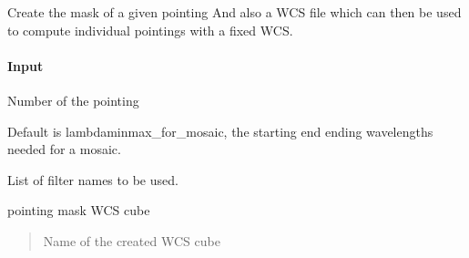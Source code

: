 \documentclass[letterpaper,10pt,english]{sphinxmanual}
\begin{document}
\begin{fulllineitems}
\begin{fulllineitems}
\end{fulllineitems}


\begin{fulllineitems}
\label{\detokenize{api/pymusepipe:pymusepipe.combine.MusePointings.create_pointing_wcs}}
\pysigstartsignatures
{}
\pysigstopsignatures
\sphinxAtStartPar
Create the mask of a given pointing
And also a WCS file which can then be used to compute individual
pointings with a fixed WCS.


\paragraph{Input}
\label{\detokenize{api/pymusepipe:id42}}\begin{description}
\sphinxAtStartPar
Number of the pointing

\sphinxAtStartPar
Default is lambdaminmax\_for\_mosaic, the starting end ending wavelengths needed for a mosaic.

\sphinxAtStartPar
List of filter names to be used.

\sphinxAtStartPar
pointing mask WCS cube

\end{description}
\begin{quote}\begin{description}
\sphinxAtStartPar
Name of the created WCS cube

\end{description}\end{quote}

\end{fulllineitems}



\end{fulllineitems}
\end{document}
